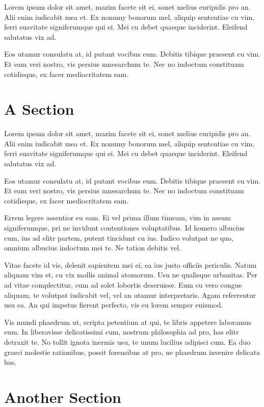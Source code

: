 \documentclass[a4paper,11pt,oneside]{report}
\begin{document}
Lorem ipsum dolor sit amet, mazim facete sit ei, sonet melius euripidis pro
an. Alii enim iudicabit mea et. Ex nonumy bonorum mel, aliquip sententiae cu
vim, ferri suavitate signiferumque qui ei. Mei cu debet quaeque
inciderint. Eleifend salutatus vix ad.

Eos utamur consulatu at, id putant vocibus eum. Debitis tibique praesent cu
vim. Et eam veri nostro, vis persius mnesarchum te. Nec no indoctum constituam
cotidieque, ex facer mediocritatem eam.


\section{A Section}

Lorem ipsum dolor sit amet, mazim facete sit ei, sonet melius euripidis pro
an. Alii enim iudicabit mea et. Ex nonumy bonorum mel, aliquip sententiae cu
vim, ferri suavitate signiferumque qui ei. Mei cu debet quaeque
inciderint. Eleifend salutatus vix ad.

Eos utamur consulatu at, id putant vocibus eum. Debitis tibique praesent cu
vim. Et eam veri nostro, vis persius mnesarchum te. Nec no indoctum constituam
cotidieque, ex facer mediocritatem eam.

Errem legere assentior eu eam. Ei vel prima illum timeam, vim in assum
signiferumque, pri ne invidunt contentiones voluptatibus. Id homero albucius
cum, ius ad elitr partem, putent tincidunt cu ius. Iudico volutpat ne quo,
omnium albucius indoctum mei te. Ne tation debitis vel.

Vitae facete id vis, delenit sapientem mei ei, ea ius justo officiis
periculis. Natum aliquam vim et, cu vix mollis animal atomorum. Usu ne qualisque
urbanitas. Per ad vitae complectitur, cum ad solet lobortis deseruisse. Eum cu
vero congue aliquam, te volutpat iudicabit vel, vel an utamur
interpretaris. Agam referrentur usu ea. An qui impetus fierent perfecto, vis eu
lorem semper euismod.

Vis mundi phaedrum ut, scripta petentium at qui, te libris appetere laboramus
eum. In liberavisse delicatissimi cum, nostrum philosophia ad pro, has elitr
detraxit te. No tollit ignota inermis usu, te unum lucilius adipisci cum. Ea duo
graeci molestie rationibus, possit forensibus at pro, ne phaedrum invenire
delicata has.

\section{Another Section}
\end{document}
